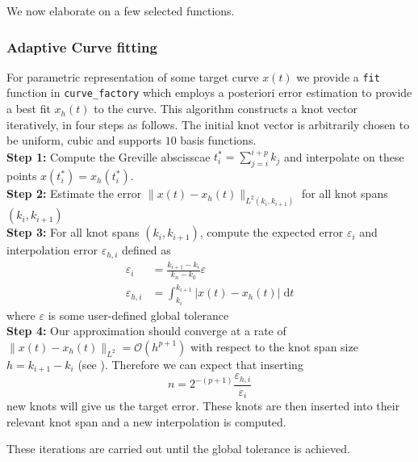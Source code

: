 \documentclass[preprint,12pt, a4paper]{elsarticle}
\begin{document}
We now elaborate on a few selected functions.

\subsubsection{Adaptive Curve fitting}
\label{sec:adaptive-curve-fit}

For parametric representation of some target curve $x(t)$ we provide a \texttt{fit} function in \texttt{curve\_factory} which employs a posteriori error estimation to provide a best fit $x_h(t)$ to the curve.
This algorithm constructs a knot vector iteratively, in four steps as follows.
The initial knot vector is arbitrarily chosen to be uniform, cubic and supports $10$ basis functions.
\\ \textbf{Step 1:}
Compute the Greville abscisscae $t^*_i = \sum_{j=i}^{i+p} k_j$ and interpolate on these points $x(t_i^*) = x_h(t_i^*)$.
\\ \textbf{Step 2:}
Estimate the error $\|x(t)-x_h(t)\|_{L^2(k_i,k_{i+1})}$ for all knot spans $(k_i,k_{i+1})$
\\ \textbf{Step 3:}
For all knot spans $(k_i,k_{i+1})$, compute the expected error $\varepsilon_i$ and interpolation error $\varepsilon_{h,i}$ defined as
\begin{align}
  \varepsilon_i     & = \frac{k_{i+1} - k_i}{k_n - k_0}\varepsilon \\
  \varepsilon_{h,i} & = \int_{k_i}^{k_{i+1}} |x(t) - x_h(t)| \;\text{d}t
\end{align}
where $\varepsilon$ is some user-defined global tolerance
\\ \textbf{Step 4:}
Our approximation should converge at a rate of $\|x(t)-x_h(t)\|_{L^2} = \mathcal{O}(h^{p+1})$ with respect to the knot span size $h=k_{i+1}-k_i$ (see \cite{deboor1978apg}). Therefore we can expect that inserting
\begin{equation}
    n = 2^{-(p+1)}\frac{\varepsilon_{h,i}}{\varepsilon_i}
\end{equation}
new knots will give us the target error.
These knots are then inserted into their relevant knot span and a new interpolation is computed.

These iterations are carried out until the global tolerance is achieved.
\end{document}
